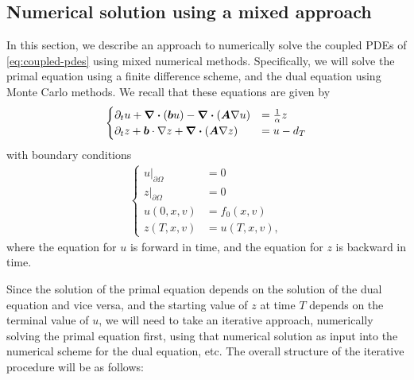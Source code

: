 \documentclass{article}  %
\begin{document}
\subsection{Numerical solution using a mixed approach}







In this section, we describe an approach to numerically solve the coupled PDEs of \autoref{eq:coupled-pdes} using mixed numerical methods. Specifically, we will solve the primal equation using a finite difference scheme, and the dual equation using Monte Carlo methods. We recall that these equations are given by 
%
\begin{align} 
    \begin{cases} 
        \partial_t u + \div{(\boldsymbol{b}u)} - \div{(\boldsymbol{A} \nabla u)} &= \frac{1}{\alpha} z\\
        \partial_t z + \boldsymbol{b} \cdot \nabla z + \div{(\boldsymbol{A} \nabla z)} &= u - d_T
    \end{cases}
\end{align}
%
with boundary conditions 
%
\begin{align}
    \begin{cases} 
        {u \rvert}_{\partial \Omega} &= 0\\
        {z \rvert}_{\partial \Omega} &= 0\\
        u(0,x,v) &= f_0(x,v)\\
        z(T,x,v) &= u(T,x,v),
    \end{cases} 
\end{align}
%
where the equation for $u$ is forward in time, and the equation for $z$ is backward in time. 

Since the solution of the primal equation depends on the solution of the dual equation and vice versa, and the starting value of $z$ at time $T$ depends on the terminal value of $u$, we will need to take an iterative approach, numerically solving the primal equation first, using that numerical solution as input into the numerical scheme for the dual equation, etc. The overall structure of the iterative procedure will be as follows:
\end{document}
